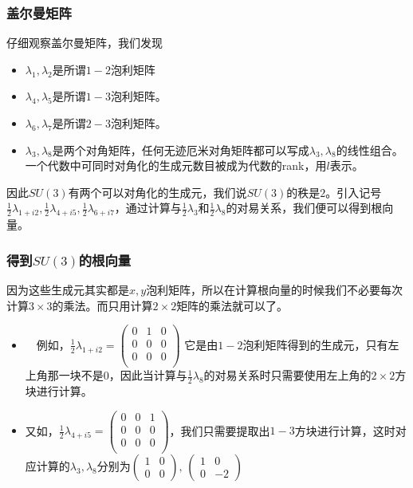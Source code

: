 \documentclass[aspectratio=1610,12pt]{beamer}
\begin{document}
\begin{frame}\frametitle{盖尔曼矩阵}
  仔细观察盖尔曼矩阵，我们发现
  \begin{itemize}
  \item $\lambda_1,\lambda_2$是所谓$1-2$泡利矩阵
  \item $\lambda_4,\lambda_5$是所谓$1-3$泡利矩阵。
  \item $\lambda_6,\lambda_7$是所谓$2-3$泡利矩阵。
  \item $\lambda_3,\lambda_8$是两个对角矩阵，任何无迹厄米对角矩阵都可以写成$\lambda_3,\lambda_8$的线性组合。一个代数中可同时对角化的生成元数目被成为代数的rank，用$l$表示。
  \end{itemize}
  因此$SU(3)$有两个可以对角化的生成元，我们说$SU(3)$的秩是$2$。引入记号$\frac{1}{2}\lambda_{1+i2},\frac{1}{2}\lambda_{4+i5},\frac12\lambda_{6+i7}$，通过计算与$\frac12\lambda_3$和$\frac12\lambda_8$的对易关系，我们便可以得到根向量。  
\end{frame}
\begin{frame}\frametitle{得到$SU(3)$的根向量}
因为这些生成元其实都是$x,y$泡利矩阵，所以在计算根向量的时候我们不必要每次计算$3\times 3$的乘法。而只用计算$2\times 2$矩阵的乘法就可以了。
\begin{itemize}
  \item　例如，$\frac{1}{2}\lambda_{1+i2} = \begin{pmatrix} 0&1&0 \\ 0&0&0 \\ 0&0&0\\
  \end{pmatrix}$
  它是由$1-2$泡利矩阵得到的生成元，只有左上角那一块不是$0$，因此当计算与$\frac{1}{2}\lambda_8$的对易关系时只需要使用左上角的$2\times2$方块进行计算。
  \item 又如，$\frac{1}{2}\lambda_{4+i5} = \begin{pmatrix} 0&0&1 \\ 0&0&0 \\ 0&0&0\\
  \end{pmatrix}$，我们只需要提取出$1-3$方块进行计算，这时对应计算的$\lambda_3,\lambda_8$分别为$\begin{pmatrix} 1&0\\0&0\end{pmatrix},\,\begin{pmatrix} 1&0\\0&-2\end{pmatrix}$
  \end{itemize}
\end{frame}
\end{document}
